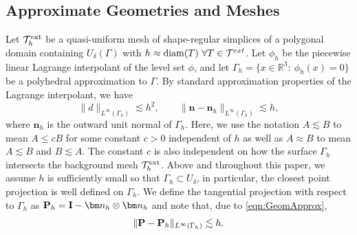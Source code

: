 \documentclass[10pt, a4paper]{amsart}
\newcommand{\bn}{{\bm n}}
\newcommand{\bbR}{\mathbb{R}}
\newcommand{\calT}{\mathcal{T}}
\theoremstyle{definition}
\theoremstyle{remark}
\theoremstyle{example}
\numberwithin{equation}{section}
\begin{document}
\subsection{Approximate Geometries and Meshes}
%
Let $\calT^{\rm ext}_h$ be a quasi-uniform mesh of shape-regular simplices of a polygonal domain containing $U_{\delta}(\Gamma)$ with $h \approx {\rm diam}(T)\ \forall T\in \calT^{ext}$. Let $\phi_h$ be the  piecewise linear Lagrange interpolant
of the level set $\phi$, and let $\Gamma_h = \{x\in \bbR^3:\ \phi_h(x)=0\}$
be a polyhedral approximation to $\Gamma$. By standard approximation
properties of the Lagrange interpolant, we have
\begin{equation}\label{eqn:GeomApprox}
\|d\|_{L^\infty(\Gamma_h)} \lesssim h^{2}, \qquad \|\bn - \bn_h\|_{L^\infty(\Gamma_h)} \lesssim h,
\end{equation}
%
where $\bn_h$ is the outward unit normal of $\Gamma_h$. Here, we use the notation $A \lesssim B$ to mean $A \le cB$ for some constant $c > 0$ independent of $h$ as well as $A \approx B$ to mean $A \lesssim B$ and $B \lesssim A$. The constant $c$ is also
independent on how the surface $\Gamma_h$ intersects 
the background mesh $\calT^{\rm ext}_h$.
Above and throughout this paper, 
we assume $h$ is sufficiently small so that $\Gamma_h\subset U_\delta$, in particular,
the closest point projection is well defined on $\Gamma_h$.
We define the tangential projection with respect
to $\Gamma_h$ as ${\bf P}_h = {\bf I}- \bn_h\otimes \bn_h$
and note that, due to \eqref{eqn:GeomApprox},
\begin{equation}\label{eqn:PPhDiff}
\|{\bf P}-{\bf P}_h\|_{L^\infty(\Gamma_h)}\lesssim h.
\end{equation}
\end{document}

